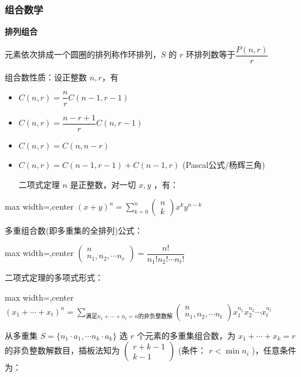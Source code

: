 \documentclass[twocolumn,10pt]{ctexart}
\makeatletter
\newcommand{\hfive}[1]{\par\addvspace{6pt}\@afterindentfalse
  {\noindent\bfseries\normalsize #1}\par\nobreak\vspace{2pt}}
\makeatother
\begin{document}
\subsubsection{组合数学}

\hfive{排列组合}

元素依次排成一个圆圈的排列称作环排列，$S$ 的 $r$ 环排列数等于$\dfrac{P(n,r)}r$

组合数性质：设正整数 $n,r$，有

\begin{itemize}
\item $C(n,r)=\dfrac nrC(n-1,r-1)$
\item $C(n,\allowbreak{}r)=\dfrac{n-r+1}{r}C(n,\allowbreak{}r-1)$
\item $C(n,r)=C(n,n-r)$
\item $C(n,r)=C(n-1,r-1)+C(n-1,r)$  (Pascal公式/杨辉三角)

二项式定理 $n$ 是正整数，对一切 $x,y$ ，有：
\end{itemize}

\begin{adjustbox}{max width=\linewidth,center}
$(x+y)^n=\sum_{k=0}^n\begin{pmatrix}n\\k\end{pmatrix}x^ky^{n-k}$
\end{adjustbox}

多重组合数(即多重集的全排列)公式：

\begin{adjustbox}{max width=\linewidth,center}
$\begin{pmatrix}n\\n_1,n_2,\cdots n_r\end{pmatrix}=\dfrac{n!}{n_1!n_2!\cdots n_t!}$
\end{adjustbox}

二项式定理的多项式形式：

\begin{adjustbox}{max width=\linewidth,center}
$(x_1+\cdots+x_t)^n=\sum_{\text{满足}n_1+\cdots+n_t=n\text{的非负整数解}}
\begin{pmatrix}n\\n_1,n_2,\cdots n_t\end{pmatrix}
x_1^{n_1}x_2^{n_2}\cdots x_t^{n_t}$
\end{adjustbox}

从多重集 $S=\{n_1\cdot a_1,\allowbreak{}\cdots n_k\cdot a_k\}$ 选 $r$ 个元素的多重集组合数，为 $x_1+\cdots +x_k=r$ 的非负整数解数目，插板法知为 $\begin{pmatrix}r+k-1\\k-1\end{pmatrix}$ (条件： $r < \min n_i$ )，任意条件为：
\end{document}

